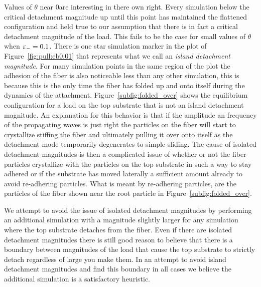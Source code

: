 Values of $\theta$ near $0$\textdegree are interesting in there own right. Every simulation below the critical detachment magnitude up until this point has maintained the flattened configuration and held true to our assumption that there is in fact a critical detachment magnitude of the load. This fails to be the case for small values of $\theta$ when $\varepsilon_-=0.1$. There is one star simulation marker in the plot of Figure~\ref{fig:pull:eb0.01} that represents what we call an \textit{island detachment magnitude}. For many simulation points in the same region of the plot the adhesion of the fiber is also noticeable less than any other simulation, this is because this is the only time the fiber has folded up and onto itself during the dynamics of the attachment. Figure~\ref{subfig:folded_over} shows the equilibrium configuration for a load on the top substrate that is not an island detachment magnitude. An explanation for this behavior is that if the amplitude an frequency of the propagating waves is just right the particles on the fiber will start to crystallize stiffing the fiber and ultimately pulling it over onto itself as the detachment mode temporarily degenerates to simple sliding. The cause of isolated detachment magnitudes is then a complicated issue of whether or not the fiber particles crystallize with the particles on the top substrate in such a way to stay adhered or if the substrate has moved laterally a sufficient amount already to avoid re-adhering particles. What is meant by re-adhering particles, are the particles of the fiber shown near the root particle in Figure~\ref{subfig:folded_over}.

We attempt to avoid the issue of isolated detachment magnitudes by performing an additional simulation with a magnitude slightly larger for any simulation where the top substrate detaches from the fiber. Even if there are isolated detachment magnitudes there is still good reason to believe that there is a boundary between magnitudes of the load that cause the top substrate to strictly detach regardless of large you make them. In an attempt to avoid island detachment magnitudes and find this boundary in all cases we believe the additional simulation is a satisfactory heuristic.

